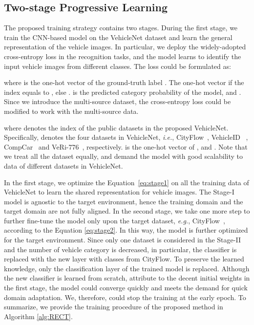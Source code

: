 \documentclass[journal]{IEEEtran}
\def\eg{\emph{e.g.}}
\def\ie{\emph{i.e.}}
\begin{document}
\subsection{Two-stage Progressive Learning} \label{sec:two-stage}
The proposed training strategy contains two stages. During the first stage, we train the CNN-based model on the VehicleNet dataset and learn the general representation of the vehicle images. In particular, we deploy the widely-adopted cross-entropy loss in the recognition tasks, and the model learns to identify the input vehicle images from different classes. The loss could be formulated as:

where  is the one-hot vector of the ground-truth label . The one-hot vector  if the index  equals to , else .  is the predicted category probability of the model, and .
Since we introduce the multi-source dataset, the cross-entropy loss could be modified to work with the multi-source data.

where  denotes the index of the public datasets in the proposed VehicleNet. Specifically,  denotes the four datasets in VehicleNet, \ie, CityFlow~\cite{tang@cityflow}, VehicleID~\cite{liu2016pku} , CompCar~\cite{yang2015large} and VeRi-776~\cite{liu2016deep}, respectively.  is the one-hot vector of , and . Note that we treat all the dataset equally, and demand the model with good scalability to data of different datasets in VehicleNet. 

In the first stage, we optimize the Equation~\ref{eq:stage1} on all the training data of VehicleNet to learn the shared representation for vehicle images. The Stage-I model is agnostic to the target environment, hence the training domain and the target domain are not fully aligned.
In the second stage, we take one more step to further fine-tune the model only upon the target dataset, \eg, CityFlow~\cite{tang@cityflow}, according to the Equation \ref{eq:stage2}. In this way, the model is further optimized for the target environment.
Since only one dataset is considered in the Stage-II and the number of vehicle category is decreased, in particular, the classifier is replaced with the new  layer with  classes from CityFlow.
To preserve the learned knowledge, only the classification layer of the trained model is replaced. Although the new classifier is learned from scratch, attribute to the decent initial weights in the first stage, the model could converge quickly and meets the demand for quick domain adaptation. We, therefore, could stop the training at the early epoch. To summarize, we provide the training procedure of the proposed method in Algorithm \ref{alg:RECT}. 
\end{document}
